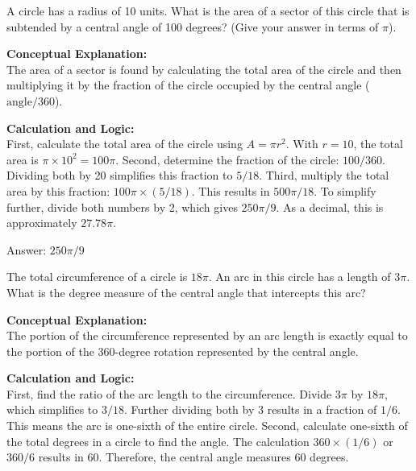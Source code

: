\documentclass[11pt,paper=a4,answers]{exam}
\begin{document}
\begin{questions}
\question
A circle has a radius of 10 units. What is the area of a sector of this circle that is subtended by a central angle of 100 degrees? (Give your answer in terms of $\pi$).

\begin{solution}
\textbf{Conceptual Explanation:} \\
The area of a sector is found by calculating the total area of the circle and then multiplying it by the fraction of the circle occupied by the central angle ($ \text{angle} / 360 $).

\vspace{30pt}

\textbf{Calculation and Logic:} \\
First, calculate the total area of the circle using $A = \pi r^2$. With $r = 10$, the total area is $\pi \times 10^2 = 100\pi$. Second, determine the fraction of the circle: $100 / 360$. Dividing both by 20 simplifies this fraction to $5 / 18$. Third, multiply the total area by this fraction: $100\pi \times (5 / 18)$. This results in $500\pi / 18$. To simplify further, divide both numbers by 2, which gives $250\pi / 9$. As a decimal, this is approximately $27.78\pi$.

\vspace{30pt}

Answer: \colorbox{yellow!100}{$250\pi/9$}
\end{solution}

\vspace{60pt}

\question
The total circumference of a circle is $18\pi$. An arc in this circle has a length of $3\pi$. What is the degree measure of the central angle that intercepts this arc?

\begin{solution}
\textbf{Conceptual Explanation:} \\
The portion of the circumference represented by an arc length is exactly equal to the portion of the 360-degree rotation represented by the central angle.

\vspace{30pt}

\textbf{Calculation and Logic:} \\
First, find the ratio of the arc length to the circumference. Divide $3\pi$ by $18\pi$, which simplifies to $3 / 18$. Further dividing both by 3 results in a fraction of $1 / 6$. This means the arc is one-sixth of the entire circle. Second, calculate one-sixth of the total degrees in a circle to find the angle. The calculation $360 \times (1 / 6)$ or $360 / 6$ results in 60. Therefore, the central angle measures 60 degrees.


\end{solution}
\end{questions}
\end{document}
